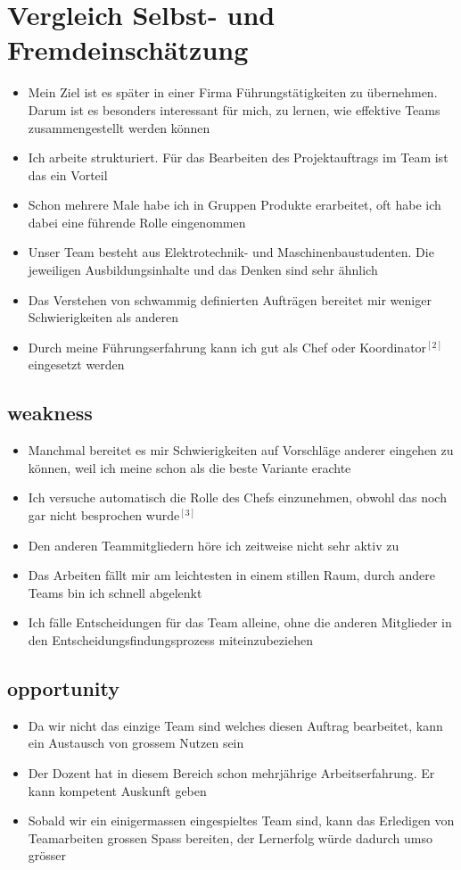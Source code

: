 \documentclass[11pt,twoside]{hsrthesis}
\begin{document}
\section{Vergleich Selbst- und Fremdeinschätzung}
\begin{itemize}
\item Mein Ziel ist es später in einer Firma Führungstätigkeiten zu übernehmen. Darum ist es besonders interessant für mich, zu lernen, wie effektive Teams zusammengestellt werden können
\item Ich arbeite strukturiert. Für das Bearbeiten des Projektauftrags im Team ist das ein Vorteil
\item Schon mehrere Male habe ich in Gruppen Produkte erarbeitet, oft habe ich dabei eine führende Rolle eingenommen
\item Unser Team besteht aus Elektrotechnik- und Maschinenbaustudenten. Die jeweiligen Ausbildungsinhalte und das Denken sind sehr ähnlich 
\item Das Verstehen von schwammig definierten Aufträgen bereitet mir weniger Schwierigkeiten als anderen
\item Durch meine Führungserfahrung kann ich gut als Chef oder Koordinator$^{[2]}$ eingesetzt werden
\end{itemize}

\subsection{weakness}
\begin{itemize}
\item Manchmal bereitet es mir Schwierigkeiten auf Vorschläge anderer eingehen zu können, weil ich meine schon als die beste Variante erachte
\item Ich versuche automatisch die Rolle des Chefs einzunehmen, obwohl das noch gar nicht besprochen wurde$^{[3]}$ 
\item Den anderen Teammitgliedern höre ich zeitweise nicht sehr aktiv zu
\item Das Arbeiten fällt mir am leichtesten in einem stillen Raum, durch andere Teams bin ich schnell abgelenkt
\item Ich fälle Entscheidungen für das Team alleine, ohne die anderen Mitglieder in den Entscheidungsfindungsprozess miteinzubeziehen 
\end{itemize}

\subsection{opportunity}
\begin{itemize}
\item Da wir nicht das einzige Team sind welches diesen Auftrag bearbeitet, kann ein Austausch von grossem Nutzen sein
\item Der Dozent hat in diesem Bereich schon mehrjährige Arbeitserfahrung. Er kann kompetent Auskunft geben
\item Sobald wir ein einigermassen eingespieltes Team sind, kann das Erledigen von Teamarbeiten grossen Spass bereiten, der Lernerfolg würde dadurch umso grösser
\end{itemize}
\end{document}
